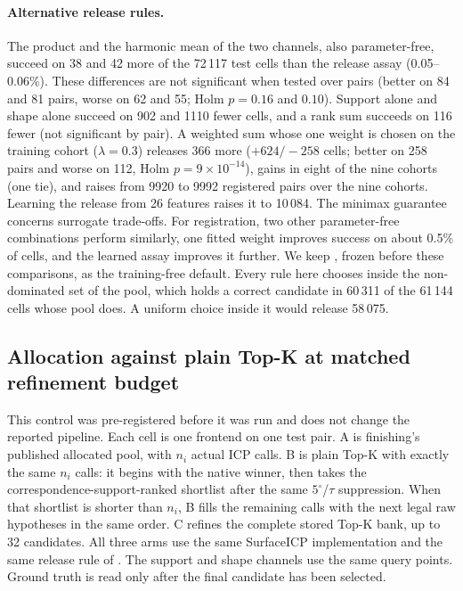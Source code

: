 \paragraph{Alternative release rules.} The product and the harmonic mean of the two channels, also parameter-free, succeed on 38 and 42 more of the 72\,117 test cells than the release assay (0.05--0.06\%). These differences are not significant when tested over pairs (better on 84 and 81 pairs, worse on 62 and 55; Holm $p=0.16$ and $0.10$). Support alone and shape alone succeed on 902 and 1110 fewer cells, and a rank sum succeeds on 116 fewer (not significant by pair). A weighted sum whose one weight is chosen on the training cohort ($\lambda=0.3$) releases 366 more ($+624/-258$ cells; better on 258 pairs and worse on 112, Holm $p=9\times10^{-14}$), gains in eight of the nine cohorts (one tie), and raises \ls{} from 9920 to 9992 registered pairs over the nine cohorts. Learning the release from 26 features raises it to 10\,084. The minimax guarantee concerns surrogate trade-offs. For registration, two other parameter-free combinations perform similarly, one fitted weight improves success on about 0.5\% of cells, and the learned assay improves it further. We keep , frozen before these comparisons, as the training-free default. Every rule here chooses inside the non-dominated set of the pool, which holds a correct candidate in 60\,311 of the 61\,144 cells whose pool does. A uniform choice inside it would release 58\,075.

\subsection{Allocation against plain Top-K at matched refinement budget}
\label{S-sec:s-topk}

This control was pre-registered before it was run and does not change the reported pipeline. Each cell is one frontend on one test pair. A is finishing's published allocated pool, with $n_i$ actual ICP calls. B is plain Top-K with exactly the same $n_i$ calls: it begins with the native winner, then takes the correspondence-support-ranked shortlist after the same $5^\circ$/$\tau$ suppression. When that shortlist is shorter than $n_i$, B fills the remaining calls with the next legal raw hypotheses in the same order. C refines the complete stored Top-K bank, up to 32 candidates. All three arms use the same SurfaceICP implementation and the same release rule of . The support and shape channels use the same query points. Ground truth is read only after the final candidate has been selected.

